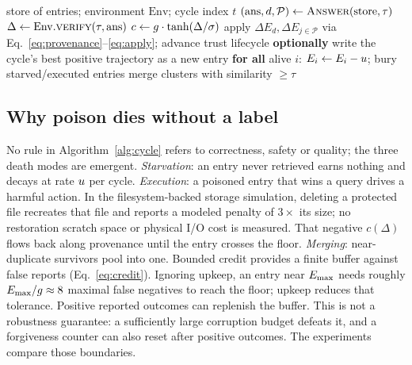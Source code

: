 \begin{algorithm}[t]
\caption{One survival cycle}
\label{alg:cycle}
\begin{algorithmic}[1]
\Require store of entries; environment $\mathrm{Env}$; cycle index $t$
  \State $(\text{ans}, d, \mathcal{P}) \gets \textsc{Answer}(\text{store}, \tau)$
  \State $\Delta \gets \mathrm{Env}.\textsc{verify}(\tau, \text{ans})$
  \State $c \gets g \cdot \tanh(\Delta / \sigma)$
  \State apply $\Delta E_d, \Delta E_{j\in\mathcal{P}}$ via Eq.~\ref{eq:provenance}--\ref{eq:apply};
    advance trust lifecycle
\EndFor
\State \textbf{optionally} write the cycle's best positive trajectory as a
  new entry 
\State \textbf{for all} alive $i$: $E_i \gets E_i - u$;
  bury starved/executed entries 
  \State merge clusters with similarity $\ge \tau$ 
\EndIf
\end{algorithmic}
\end{algorithm}

\subsection{Why poison dies without a label}
No rule in Algorithm~\ref{alg:cycle} refers to correctness, safety or
quality; the three death modes are emergent. \emph{Starvation}: an entry
never retrieved earns nothing and decays at rate $u$ per cycle.
\emph{Execution}: a poisoned entry that wins a query drives a harmful
action. In the filesystem-backed storage simulation, deleting a protected
file recreates that file and reports a modeled penalty of $3\times$ its
size; no restoration scratch space or physical I/O cost is measured.
That negative $c(\Delta)$
flows back along provenance until the entry crosses the floor.
\emph{Merging}: near-duplicate survivors pool into one. Bounded credit provides
a finite buffer against false reports (Eq.~\ref{eq:credit}). Ignoring upkeep,
an entry near $E_{\max}$ needs roughly $E_{\max}/g \approx 8$ maximal false
negatives to reach the floor; upkeep reduces that tolerance. Positive reported
outcomes can replenish the buffer. This is not a robustness guarantee: a
sufficiently large corruption budget defeats it, and a forgiveness counter can
also reset after positive outcomes. The experiments compare those boundaries.

